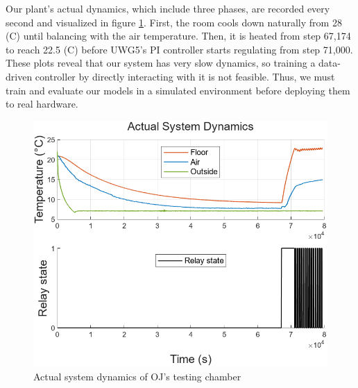 \documentclass[../main.tex]{subfiles}
\begin{document}
Our plant's actual dynamics, which include three phases, are recorded every second and visualized in figure \ref{fig:actual_dynamics}. First, the room cools down naturally from 28 (\degree C) until balancing with the air temperature. Then, it is heated from step 67,174 to reach 22.5 (\degree C) before UWG5's PI controller starts regulating from step 71,000. These plots reveal that our system has very slow dynamics, so training a data-driven controller by directly interacting with it is not feasible. Thus, we must train and evaluate our models in a simulated environment before deploying them to real hardware.
\begin{figure}
    \centering
    \includegraphics[width=\linewidth]{figures/ActualSystemDynamics.png}
    \caption{Actual system dynamics of OJ's testing chamber}
    \label{fig:actual_dynamics}
\end{figure}
\end{document}
